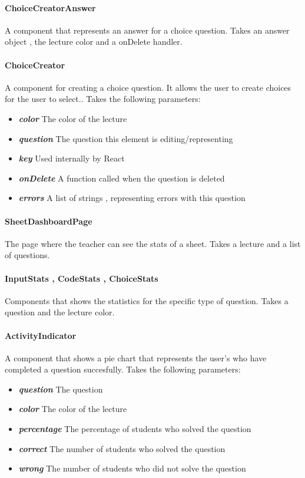 \paragraph{ChoiceCreatorAnswer} A component that represents an answer for a choice question. Takes an answer object , the lecture color and a onDelete handler.
\paragraph{ChoiceCreator} A component for creating a choice question. It allows the user to create choices for the user to select.. Takes the following parameters:
\begin{itemize}
	\item \textit{\textbf{color}} The color of the lecture
	\item \textit{\textbf{question}} The question this element is editing/representing
	\item \textit{\textbf{key}} Used internally by React
	\item \textit{\textbf{onDelete}} A function called when the question is deleted
	\item \textit{\textbf{errors}} A list of strings , representing errors with this question
\end{itemize}
\paragraph{SheetDashboardPage} The page where the teacher can see the stats of a sheet. Takes a lecture and a list of questions.
\paragraph{InputStats , CodeStats , ChoiceStats} Components that shows the statistics for the specific type of question. Takes a question and the lecture color.
\paragraph{ActivityIndicator} A component that shows a pie chart that represents the user's who have completed a question succesfully. Takes the following parameters:
\begin{itemize}
	\item \textit{\textbf{question}} The question
	\item \textit{\textbf{color}} The color of the lecture
	\item \textit{\textbf{percentage}} The percentage of students who solved the question
	\item \textit{\textbf{correct}} The number of students who solved the question
	\item \textit{\textbf{wrong}} The number of students who did not solve the question
\end{itemize}
